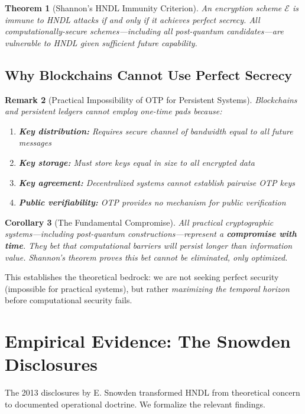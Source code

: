\documentclass[11pt,a4paper]{article}
\newtheorem{theorem}{Theorem}[section]
\newtheorem{corollary}[theorem]{Corollary}
\newtheorem{remark}[theorem]{Remark}
\begin{document}
\begin{theorem}[Shannon's HNDL Immunity Criterion]
An encryption scheme $\mathcal{E}$ is immune to HNDL attacks if and only if it achieves perfect secrecy. All computationally-secure schemes---including all post-quantum candidates---are vulnerable to HNDL given sufficient future capability.
\end{theorem}

\subsection{Why Blockchains Cannot Use Perfect Secrecy}

\begin{remark}[Practical Impossibility of OTP for Persistent Systems]
Blockchains and persistent ledgers cannot employ one-time pads because:
\begin{enumerate}[noitemsep]
    \item \textbf{Key distribution:} Requires secure channel of bandwidth equal to all future messages
    \item \textbf{Key storage:} Must store keys equal in size to all encrypted data
    \item \textbf{Key agreement:} Decentralized systems cannot establish pairwise OTP keys
    \item \textbf{Public verifiability:} OTP provides no mechanism for public verification
\end{enumerate}
\end{remark}

\begin{corollary}[The Fundamental Compromise]
All practical cryptographic systems---including post-quantum constructions---represent a \textbf{compromise with time}. They bet that computational barriers will persist longer than information value. Shannon's theorem proves this bet cannot be eliminated, only optimized.
\end{corollary}

This establishes the theoretical bedrock: we are not seeking perfect security (impossible for practical systems), but rather \textit{maximizing the temporal horizon} before computational security fails.

\section{Empirical Evidence: The Snowden Disclosures}

The 2013 disclosures by E. Snowden transformed HNDL from theoretical concern to documented operational doctrine. We formalize the relevant findings.
\end{document}
